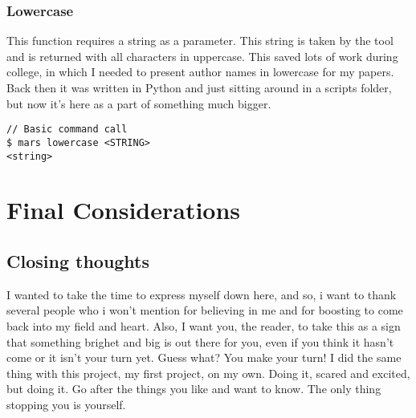 \documentclass{report}
\begin{document}
\subsection{Lowercase}
This function requires a string as a parameter. This string is taken by the tool and is returned with all characters in uppercase. This saved lots of work during college, in which I needed to present author names in lowercase for my papers. Back then it was written in Python and just sitting around in a scripts folder, but now it's here as a part of something much bigger.
\begin{lstlisting}
// Basic command call
$ mars lowercase <STRING>
<string>
\end{lstlisting}

\chapter{Final Considerations}
\section{Closing thoughts}
I wanted to take the time to express myself down here, and so, i want to thank several people who i won't mention for believing in me and for boosting to come back into my field and heart. Also, I want you, the reader, to take this as a sign that something brighet and big is out there for you, even if you think it hasn't come or it isn't your turn yet. Guess what? You make your turn! I did the same thing with this project, my first project, on my own. Doing it, scared and excited, but doing it. Go after the things you like and want to know. The only thing stopping you is yourself.

\printbibliography[title=Citations]
\end{document}
